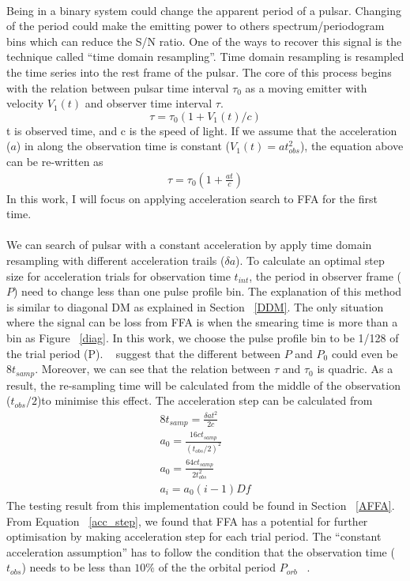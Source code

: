 \documentclass[thesis_msc.tex]{subfiles}
\begin{document}
	\paragraph{} Being in a binary system could change the apparent period of a pulsar. Changing of the period could make the emitting power to others spectrum/periodogram bins which can reduce the S/N ratio. One of the ways to recover this signal is the technique called ``time domain resampling''. Time domain resampling is resampled the time series into the rest frame of the pulsar. The core of this process begins with the relation between pulsar time interval $\tau_0$  as a moving emitter with velocity $V_1(t)$ and observer time interval $\tau$. 
\begin{equation}
\tau=\tau_0(1+V_1(t)/c)
\end{equation}
t is observed time, and c is the speed of light. If we assume that the acceleration ($a$) in along the observation time is constant ($V_1(t)=at_{obs}^2$), the equation above can be re-written as 
\begin{eqnarray}
\tau=\tau_0(1+\frac{at}{c})
\end{eqnarray} 
In this work, I will focus on applying acceleration search to FFA for the first time.

\paragraph{} We can search of pulsar with a constant acceleration by apply time domain resampling with different acceleration trails ($\delta a$). To calculate an optimal step size for acceleration trials for observation time $t_{int}$, the period in observer frame ($P$) need to change less than one pulse profile bin. The explanation of this method is similar to diagonal DM as explained in Section ~\ref{DDM}. The only situation where the signal can be loss from FFA is when the smearing time is more than a bin as Figure ~\ref{diag}.     In this work, we choose the pulse profile bin to be 1/128 of the trial period (P). ~\cite{Ralph} suggest that the different between $P$ and $P_0$ could even be $8 t_{samp}$. Moreover, we can see that the relation between $\tau$ and $\tau_0$ is quadric. As a result, the re-sampling time will be calculated from the middle of the observation ($t_{obs}/2$)to minimise this effect. The acceleration step can be calculated from
\begin{eqnarray}
8t_{samp}=\frac{\delta at^2}{2c}\\
a_0 = \frac{16c t_{samp}}{(t_{obs}/2)^2}\\
a_0 = \frac{64c t_{samp}}{2 t_{obs}^2}\\
a_i=a_0(i-1)Df \label{acc_step}
\end{eqnarray}
The testing result from this implementation could be found in Section ~\ref{AFFA}. From Equation ~\ref{acc_step}, we found that FFA has a potential for further optimisation by making acceleration step for each trial period. The ``constant acceleration assumption'' has to follow the condition that the observation time ($t_{obs}$) needs to be less than $10\%$ of the the orbital period $P_{orb}$ ~\citep{ransom2002fourier}.
\end{document}
